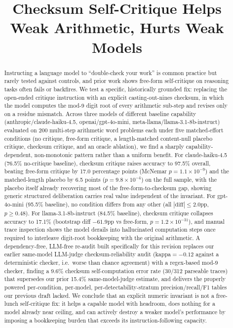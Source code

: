 \documentclass[11pt,letterpaper]{article}
\title{Checksum Self-Critique Helps Weak Arithmetic, Hurts Weak Models}
\author{}
\date{}
\begin{document}
\maketitle

\begin{abstract}
Instructing a language model to ``double-check your work'' is common practice but rarely tested against controls, and prior work shows free-form self-critique on reasoning tasks often fails or backfires. We test a specific, historically grounded fix: replacing the open-ended critique instruction with an explicit casting-out-nines checksum, in which the model computes the mod-9 digit root of every arithmetic sub-step and revises only on a residue mismatch. Across three models of different baseline capability (anthropic/claude-haiku-4.5, openai/gpt-4o-mini, meta-llama/llama-3.1-8b-instruct) evaluated on 200 multi-step arithmetic word problems each under five matched-effort conditions (no critique, free-form critique, a length-matched content-null placebo critique, checksum critique, and an oracle ablation), we find a sharply capability-dependent, non-monotonic pattern rather than a uniform benefit. For claude-haiku-4.5 (76.5\% no-critique baseline), checksum critique raises accuracy to 97.5\% overall, beating free-form critique by 17.0 percentage points (McNemar $p=1.1\times10^{-9}$) and the matched-length placebo by 6.5 points ($p=9.8\times10^{-4}$) on the full sample, with the placebo itself already recovering most of the free-form-to-checksum gap, showing generic structured deliberation carries real value independent of the invariant. For gpt-4o-mini (95.5\% baseline), no condition differs from any other (all $|\text{diff}|\le 2.0$pp, $p\ge0.48$). For llama-3.1-8b-instruct (84.5\% baseline), checksum critique collapses accuracy to 17.1\% (bootstrap diff $-61.9$pp vs free-form, $p=1.2\times10^{-31}$), and manual trace inspection shows the model derails into hallucinated computation steps once required to interleave digit-root bookkeeping with the original arithmetic. A dependency-free, LLM-free re-audit built specifically for this revision replaces our earlier same-model LLM-judge checksum-reliability audit (kappa$=-0.12$ against a deterministic checker, i.e.\ worse than chance agreement) with a regex-based mod-9 checker, finding a 9.6\% checksum self-computation error rate (30/312 parseable traces) that supersedes our prior 15.4\% same-model-judge estimate, and delivers the properly powered per-condition, per-model, per-detectability-stratum precision/recall/F1 tables our previous draft lacked. We conclude that an explicit numeric invariant is not a free-lunch self-critique fix: it helps a capable model with headroom, does nothing for a model already near ceiling, and can actively destroy a weaker model's performance by imposing a bookkeeping burden that exceeds its instruction-following capacity.
\end{abstract}
\end{document}
